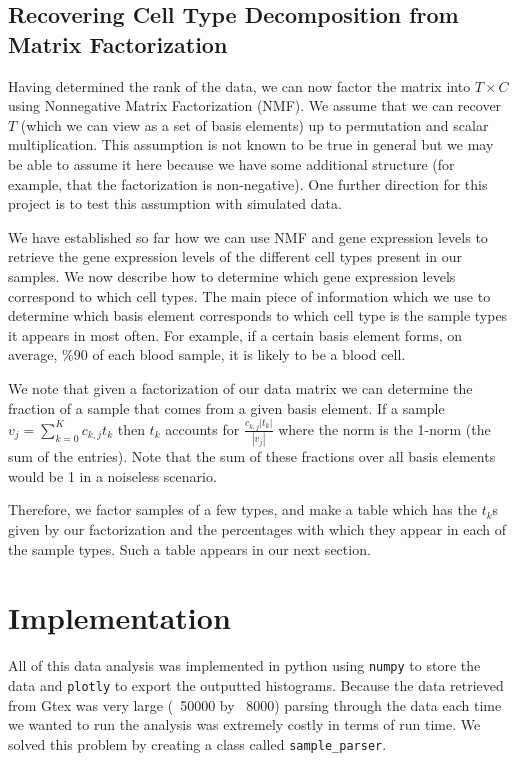 \documentclass[10pt]{article}
\begin{document}
\subsection{Recovering Cell Type Decomposition from Matrix Factorization}

Having determined the rank of the data, we can now factor the matrix into \(T \times C\) using Nonnegative Matrix Factorization (NMF).
We assume that we can recover \(T\) (which we can view as a set of basis elements) up to permutation and scalar multiplication.
This assumption is not known to be true in general but we may be able to assume it here because we have some additional structure (for example, that the factorization is non-negative).
One further direction for this project is to test this assumption with simulated data.

We have established so far how we can use NMF and gene expression levels to retrieve the gene expression levels of the different cell types present in our samples.
We now describe how to determine which gene expression levels correspond to which cell types.
The main piece of information which we use to determine which basis element corresponds to which cell type is the sample types it appears in most often.
For example, if a certain basis element forms, on average, \%90 of each blood sample, it is likely to be a blood cell.

We note that given a factorization of our data matrix we can determine the fraction of a sample that comes from a given basis element.
If a sample \(v_j = \sum\limits_{k=0}^Kc_{k, j}t_k\) then \(t_k\) accounts for \(\frac{c_{k, j}|t_k|}{|v_j|}\) where the norm is the 1-norm (the sum of the entries).
Note that the sum of these fractions over all basis elements would be 1 in a noiseless scenario.

Therefore, we factor samples of a few types, and make a table which has the \(t_k\)s given by our factorization and the percentages with which they appear in each of the sample types.
Such a table appears in our next section.

\section{Implementation}

All of this data analysis was implemented in python using \texttt{numpy} to store the data and \texttt{plotly} to export the outputted histograms.  Because the data retrieved from Gtex was very large (~50000 by ~8000) parsing through the data each time we wanted to run the analysis was extremely costly in terms of run time.  We solved this problem by creating a class called \texttt{sample\_parser}.
\end{document}
